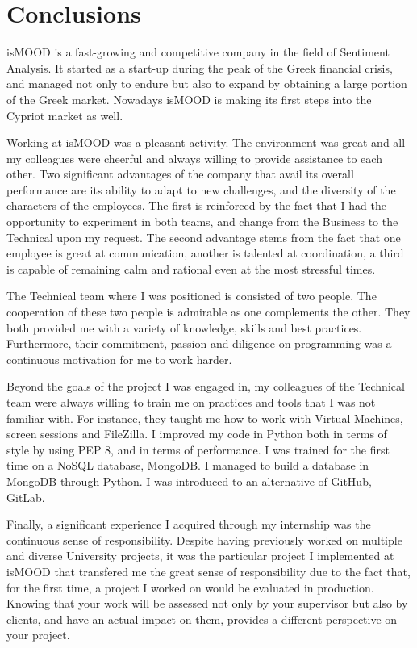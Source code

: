 \section{Conclusions}
\label{sec:conclusions}

isMOOD is a fast-growing and competitive company in the field of Sentiment Analysis.
It started as a start-up during the peak of the Greek financial crisis,
and managed not only to endure but also to expand
by obtaining a large portion of the Greek market.
Nowadays isMOOD is making its first steps into the Cypriot market as well.

Working at isMOOD was a pleasant activity.
The environment was great and all my colleagues were cheerful
and always willing to provide assistance to each other.
Two significant advantages of the company 
that avail its overall performance are its ability to adapt to new challenges,
and the diversity of the characters of the employees.
The first is reinforced by the fact
that I had the opportunity to experiment in both teams,
and change from the Business to the Technical upon my request.
The second advantage stems from the fact
that one employee is great at communication,
another is talented at coordination,
a third is capable of remaining calm and rational
even at the most stressful times.

The Technical team where I was positioned is consisted of two people.
The cooperation of these two people is admirable as one complements the other.
They both provided me with a variety of knowledge, skills and best practices.
Furthermore, their commitment, passion and diligence on programming
was a continuous motivation for me to work harder.

Beyond the goals of the project I was engaged in,
my colleagues of the Technical team were always willing
to train me on practices and tools that I was not familiar with.
For instance, they taught me how to work with Virtual Machines,
screen sessions and FileZilla.
I improved my code in Python both in terms of style by using PEP 8,
and in terms of performance.
I was trained for the first time on a NoSQL database, MongoDB.
I managed to build a database in MongoDB through Python.
I was introduced to an alternative of GitHub, GitLab.

Finally, a significant experience I acquired through my internship
was the continuous sense of responsibility.
Despite having previously worked on multiple and diverse University projects,
it was the particular project I implemented at isMOOD
that transfered me the great sense of responsibility
due to the fact that, for the first time,
a project I worked on would be evaluated in production.
Knowing that your work will be assessed not only by your supervisor
but also by clients, and have an actual impact on them,
provides a different perspective on your project.
